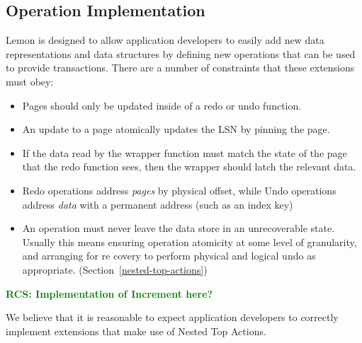 \documentclass[letterpaper,twocolumn,english]{article}
\newcommand{\yad}{Lemon\xspace}
\newcommand{\rcs}[1]{\textcolor{green}{\bf RCS: #1}}
\begin{document}
%

\subsection{Operation Implementation}


\yad is designed to allow application developers to easily add new
data representations and data structures by defining new operations
that can be used to provide transactions.  There are a number of
constraints that these extensions must obey:

\begin{itemize}
\item Pages should only be updated inside of a redo or undo function.
\item An update to a page atomically updates the LSN by pinning the page.
\item If the data read by the wrapper function must match the state of
the page that the redo function sees, then the wrapper should latch
the relevant data.
\item Redo operations address {\em pages} by physical offset,
while Undo operations address {\em data} with a permanent address (such as an index key)
\item An operation must never leave the data store in an unrecoverable state.  Usually 
this means ensuring operation atomicity at some level of granularity, and arranging for re
covery to perform physical and logical undo as appropriate. (Section~\ref{nested-top-actions})
\end{itemize}

\rcs{Implementation of Increment here?}

We believe that it is reasonable to expect application developers to
correctly implement extensions that make use of Nested Top Actions.  
\end{document}
